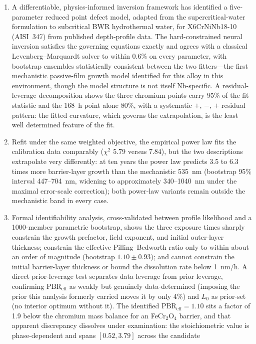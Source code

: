 \documentclass[preprint,12pt]{elsarticle}
\begin{document}
\begin{enumerate}
\item A differentiable, physics-informed inversion framework has
identified a five-parameter reduced point defect model, adapted from the
supercritical-water formulation to subcritical BWR hydrothermal water,
for X6CrNiNb18-10 (AISI~347) from published depth-profile data. The
hard-constrained neural inversion satisfies the governing equations
exactly and agrees with a classical Levenberg--Marquardt solver to
within 0.6\% on every parameter, with bootstrap ensembles statistically
consistent between the two fitters---the first mechanistic passive-film
growth model identified for this alloy in this environment, though the
model structure is not itself Nb-specific. A residual-leverage
decomposition shows the three chromium points carry 95\% of the fit
statistic and the 168~h point alone 80\%, with a systematic
$+$, $-$, $+$ residual pattern: the fitted curvature, which governs the
extrapolation, is the least well determined feature of the fit.
\item Refit under the same weighted objective, the empirical power law
fits the calibration data comparably ($\chi^2$ 5.79 versus 7.84), but
the two descriptions extrapolate very differently: at ten years the
power law predicts 3.5 to 6.3 times more barrier-layer growth than the
mechanistic 535~nm (bootstrap 95\% interval 447--704~nm, widening to
approximately 340--1040~nm under the maximal error-scale correction);
both power-law variants remain outside the mechanistic band in every
case.
\item Formal identifiability analysis, cross-validated between profile
likelihood and a 1000-member parametric bootstrap, shows the three
exposure times sharply constrain the growth prefactor, field exponent,
and initial outer-layer thickness; constrain the effective
Pilling--Bedworth ratio only to within about an order of magnitude
(bootstrap $1.10 \pm 0.93$); and cannot constrain the initial
barrier-layer thickness or bound the dissolution rate below 1~nm/h. A
direct prior-leverage test separates data leverage from prior leverage,
confirming $\mathrm{PBR}_\text{eff}$ as weakly but genuinely
data-determined (imposing the prior this analysis formerly carried moves
it by only 4\%) and $L_0$ as prior-set (no interior optimum without it).
The identified $\mathrm{PBR}_\text{eff} = 1.10$ sits a factor of 1.9
below the chromium mass balance for an FeCr$_2$O$_4$ barrier, and that
apparent discrepancy dissolves under examination: the stoichiometric
value is phase-dependent and spans $[0.52, 3.79]$ across the candidate

\end{enumerate}
\end{document}
